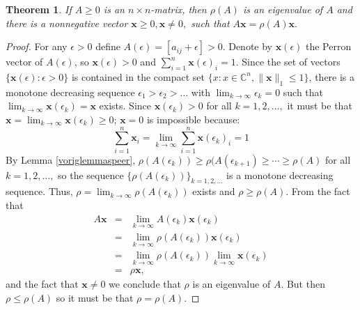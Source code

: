 \documentclass[a4paper,11pt]{report}
\newtheorem{theorem}{Theorem}[section]
\newcommand{\C}{{\mathbb C}}
\begin{document}
\begin{theorem}\label{perronzonderperron}
  If $A \geq 0$ is an $n \times n$-matrix, then $\rho(A)$ is an eigenvalue of $A$ 
  and there is a nonnegative vector $\mathbf{x} \geq 0, \mathbf{x} \not = 0,$ 
  such that $A\mathbf{x}=\rho(A)\mathbf{x}.$
\end{theorem}
\begin{proof}
  For any $\epsilon > 0$ define $A(\epsilon)=[a_{ij}+\epsilon] > 0$. Denote by $\mathbf{x}(\epsilon)$ 
  the Perron vector of $A(\epsilon)$, so $\mathbf{x}(\epsilon) > 0$ and 
  $\sum^n_{i = 1} \mathbf{x}(\epsilon)_i = 1$. Since the set of vectors $\{\mathbf{x}(\epsilon): \epsilon > 0\}$ 
  is contained in the compact set $\{x: x\in \C^n, \|\mathbf{x}\|_1 \leq 1\}$, 
  there is a monotone decreasing sequence $\epsilon_1 > \epsilon_2 > \ldots$ with $\lim_{k\to\infty}\epsilon_k = 0$
  such that $\lim_{k \to \infty}\mathbf{x}(\epsilon_k) = \mathbf{x}$ exists. 
  Since $\mathbf{x}(\epsilon_k) > 0$ for all $k=1,2,\ldots,$ it must be that $\mathbf{x} = \lim_{k \to \infty} \mathbf{x}(\epsilon_k) \geq 
  0$; $\mathbf{x} = 0$ is impossible because:
  $$\sum^n_{i = 1}\mathbf{x}_i = \lim_{k\to 
  \infty}\sum^n_{i=1}\mathbf{x}(\epsilon_k)_i = 1$$
  By Lemma \ref{voriglemmaspeer}, $\rho(A(\epsilon_k)) \geq \rho(A(\epsilon_{k+1}) \geq \cdots \geq \rho(A)$ 
  for all $k = 1, 2, \ldots, $ so the sequence $\{\rho(A(\epsilon_k))\}_{k=1,2,\ldots}$ 
  is a monotone decreasing sequence. Thus, $\rho = \lim_{k \to \infty} \rho(A(\epsilon_k))$ 
  exists and $\rho \geq \rho(A).$ From the fact that
  \begin{eqnarray*}
    A\mathbf{x} &=& \lim_{k\to\infty} A(\epsilon_k)\mathbf{x}(\epsilon_k)\\
    &=& \lim_{k\to\infty} \rho(A(\epsilon_k))\mathbf{x}(\epsilon_k)\\
    &=& \lim_{k\to \infty} \rho(A(\epsilon_k)) \lim_{k\to \infty} \mathbf{x}(\epsilon_k) \\
    &=& \rho \mathbf{x},
  \end{eqnarray*}
  and the fact that $\mathbf{x}\not = 0$ we conclude that $\rho$ is an 
  eigenvalue of $A$. But then $\rho \leq \rho(A)$ so it must be that $\rho = 
  \rho(A)$.
\end{proof}
\end{document}
